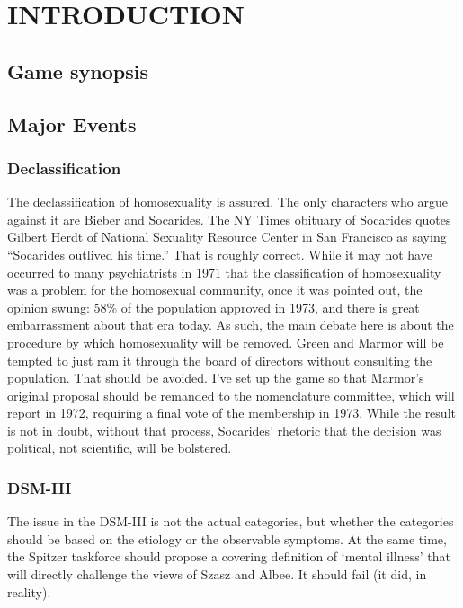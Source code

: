 \pagebreak 

\chapter{INTRODUCTION}
\label{introduction}

\section{Game synopsis}
\label{gamesynopsis}

\section{Major Events}
\label{majorevents}

\subsection{Declassification}
\label{declassification}

The declassification of homosexuality is assured. The only characters who argue against it are Bieber and Socarides. The NY Times obituary of Socarides quotes Gilbert Herdt of National Sexuality Resource Center in San Francisco as saying “Socarides outlived his time.” That is roughly correct. While it may not have occurred to many psychiatrists in 1971 that the classification of homosexuality was a problem for the homosexual community, once it was pointed out, the opinion swung: 58\% of the population approved in 1973, and there is great embarrassment about that era today.
As such, the main debate here is about the procedure by which homosexuality will be removed. Green and Marmor will be tempted to just ram it through the board of directors without consulting the population. That should be avoided. I've set up the game so that Marmor's original proposal should be remanded to the nomenclature committee, which will report in 1972, requiring a final vote of the membership in 1973. While the result is not in doubt, without that process, Socarides' rhetoric that the decision was political, not scientific, will be bolstered.

\subsection{DSM-III}
\label{dsm-iii}

The issue in the DSM-III is not the actual categories, but whether the categories should be based on the etiology or the observable symptoms. At the same time, the Spitzer taskforce should propose a covering definition of `mental illness' that will directly challenge the views of Szasz and Albee. It should fail (it did, in reality). 

